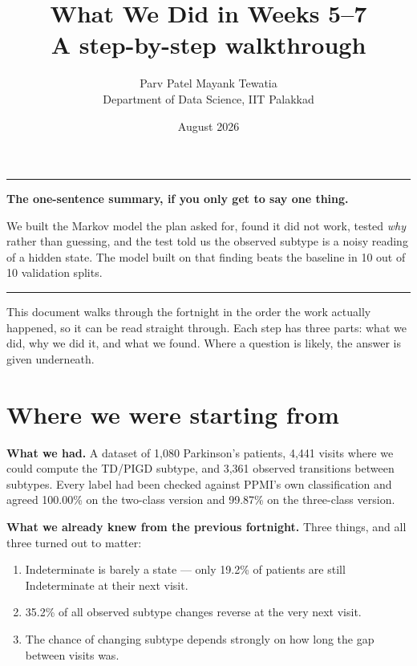 \documentclass[11pt,a4paper]{article}
\title{\textbf{What We Did in Weeks 5--7}\\[0.5em]
       \large A step-by-step walkthrough}
\author{Parv Patel \quad\textbullet\quad Mayank Tewatia\\[0.3em]
        \small Department of Data Science, IIT Palakkad}
\date{August 2026}
\newenvironment{found}
  {\begin{center}\begin{minipage}{0.95\textwidth}%
   \vspace{4pt}\hrule\vspace{6pt}\small}
  {\vspace{6pt}\hrule\vspace{4pt}\end{minipage}\end{center}}
\begin{document}
\maketitle

\vspace{-1em}
\begin{found}
\textbf{The one-sentence summary, if you only get to say one thing.}

We built the Markov model the plan asked for, found it did not work, tested
\emph{why} rather than guessing, and the test told us the observed subtype is a
noisy reading of a hidden state. The model built on that finding beats the
baseline in 10 out of 10 validation splits.
\end{found}

\noindent
This document walks through the fortnight in the order the work actually
happened, so it can be read straight through. Each step has three parts: what
we did, why we did it, and what we found. Where a question is likely, the
answer is given underneath.

\clearpage
\tableofcontents
\clearpage

\section{Where we were starting from}

\textbf{What we had.} A dataset of 1{,}080 Parkinson's patients, 4{,}441 visits
where we could compute the TD/PIGD subtype, and 3{,}361 observed transitions
between subtypes. Every label had been checked against PPMI's own
classification and agreed 100.00\% on the two-class version and 99.87\% on the
three-class version.

\textbf{What we already knew from the previous fortnight.} Three things, and all
three turned out to matter:

\begin{enumerate}
  \item Indeterminate is barely a state --- only 19.2\% of patients are still
        Indeterminate at their next visit.
  \item 35.2\% of all observed subtype changes reverse at the very next visit.
  \item The chance of changing subtype depends strongly on how long the gap
        between visits was.
\end{enumerate}
\end{document}
